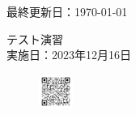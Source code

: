 \documentclass[a4paper,11pt]{jsarticle}
\begin{document}
\begin{titlepage}
  \hfill {最終更新日：\today}
  \begin{center}
    {\Huge\gt テスト演習}\\ \vspace{\baselineskip}
    \textup{\large 実施日：2023年12月16日}\\ 
  \end{center}
  \vfill
  \begin{figure}[H]
    \includegraphics[width=0.1\textwidth]{../graphs/qrcode.png}
  \end{figure}
\end{titlepage}

\qPart


\qPart



\qPart






\brankPage
\end{document}
